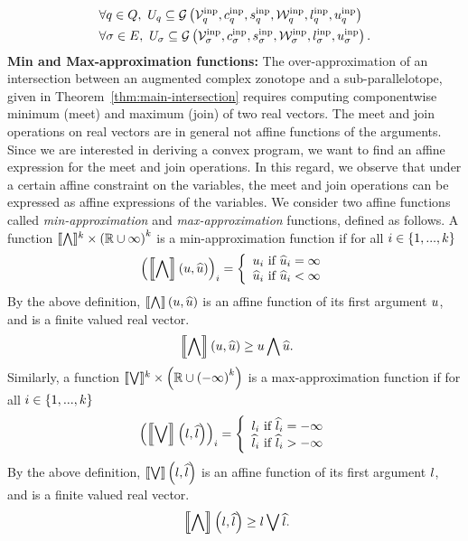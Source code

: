 %
\begin{align}
& \forall
\loc\in\locations,~\inputset_\loc\subseteq\acztope{\inputtemp_\loc}{\inputcen_\loc}{\inputsfact_\loc}{\inputstemp_\loc}{\inputlb_\loc}{\inputub_\loc}\\
& \forall \edge\in\edgeset,~\inputset_\edge\subseteq\acztope{\inputtemp_\edge}{\inputcen_\edge}{\inputsfact_\edge}{\inputstemp_\edge}{\inputlb_\edge}{\inputub_\edge}.
\end{align}
%
{\bf Min and Max-approximation functions:} The over-approximation of
an intersection between an augmented complex zonotope and a
sub-parallelotope, given in Theorem~\ref{thm:main-intersection}
requires computing componentwise minimum (meet) and maximum (join) of
two real vectors.  The meet and join operations on real vectors are in
general not affine functions of the arguments.  Since we are
interested in deriving a convex program, we want to find an affine
expression for the meet and join operations.  In this regard, we
observe that under a certain affine constraint on the variables, the
meet and join operations can be expressed as affine expressions of the
variables.  We consider two affine functions
called \emph{min-approximation} and \emph{max-approximation}
functions, defined as follows.  A function
$\minapproxsymbol:\reals^k\times\lt(\reals\cup\infty\rt)^k$ is a
min-approximation function if for all $i\in\set{1,...,k}$
%
\[
\lt(\minapprox{\ub}{\pub}\rt)_i=
\lt\{
\begin{array}{l}
\ub_i~\text{if}~\pub_i=\infty\\
\pub_i~\text{if}~\pub_i<\infty
\end{array}
\rt.
\]
%
By the above definition, $\minapprox{\ub}{\pub}$ is an affine function of its
first argument $\ub$, and is a finite valued real vector.
%
\begin{equation}~\label{eqn:minapprox}
\minapprox{\ub}{\pub}\geq\meet{\ub}{\pub}.
\end{equation}
%
Similarly, a function
$\maxapproxsymbol:\reals^k\times\lt(\reals\cup\lt(-\infty\rt)^k\rt)$
is a max-approximation function if for all $i\in\set{1,...,k}$
%
\[
\lt(\maxapprox{\lb}{\plb}\rt)_i=
\lt\{
\begin{array}{l}
\lb_i~\text{if}~\plb_i=-\infty\\
\plb_i~\text{if}~\plb_i>-\infty
\end{array}
\rt.
\]
%
By the above definition, $\maxapprox{\lb}{\plb}$ is an affine function
of its first argument $\lb$, and is a finite valued real vector.
%
\begin{equation}~\label{eqn:minapprox}
\minapprox{\lb}{\plb}\geq\join{\lb}{\plb}.
\end{equation}
